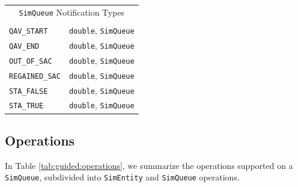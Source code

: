 \documentclass[12pt]{book}
\begin{document}
\begin{table}[h]
\begin{center}
\begin{tabular}{|l|l|}
\multicolumn{2}{|c|}{\lstinline[basicstyle=\ttfamily]{SimQueue} Notification Types} \\
\multicolumn{2}{|c|}{} \\
\hline
\lstinline|QAV_START|    & \lstinline|double|, \lstinline|SimQueue| \\ \hline
\lstinline|QAV_END|      & \lstinline|double|, \lstinline|SimQueue| \\ \hline
\lstinline|OUT_OF_SAC|   & \lstinline|double|, \lstinline|SimQueue| \\ \hline
\lstinline|REGAINED_SAC| & \lstinline|double|, \lstinline|SimQueue| \\ \hline
\lstinline|STA_FALSE|    & \lstinline|double|, \lstinline|SimQueue| \\ \hline
\lstinline|STA_TRUE|     & \lstinline|double|, \lstinline|SimQueue| \\ \hline
\end{tabular}
\end{center}
\end{table}

\subsection{Operations}

In Table \ref{tab:guided:operations},
  we summarize the operations supported on a \lstinline|SimQueue|,
  subdivided into \lstinline|SimEntity|
  and \lstinline|SimQueue| operations.
\end{document}

